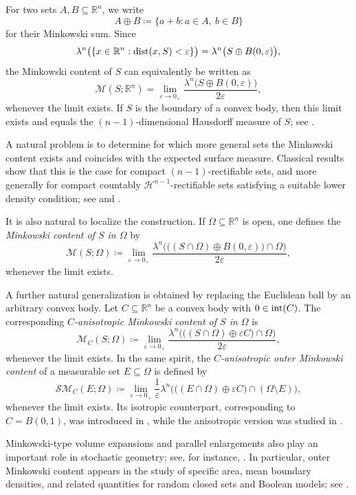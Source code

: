 \documentclass[pdflatex,sn-mathphys-num]{sn-jnl}
\theoremstyle{plain}
\theoremstyle{definition}
\DeclareMathOperator{\inter}{\textup{int}}
\DeclareMathOperator{\dist}{\textup{dist}}
\begin{document}
For two sets $A,B\subseteq\mathbb{R}^n$, we write
\[
A\oplus B \coloneq \{a+b : a\in A,\ b\in B\}
\]
for their Minkowski sum. Since
\[
\lambda^n\big(\{x\in\mathbb{R}^n:\dist(x,S)<\varepsilon\}\big)=\lambda^n\big(S\oplus B(0,\varepsilon)\big),
\]
the Minkowski content of $S$ can equivalently be written as
\[
\mathcal{M}(S; \mathbb{R}^n)
=
\lim_{\varepsilon\to0_+}
\frac{\lambda^n\big(S\oplus B(0,\varepsilon)\big)}{2\varepsilon},
\]
whenever the limit exists. If $S$ is the boundary of a convex body, then this limit exists and equals the $(n-1)$-dimensional Hausdorff measure of $S$; see \cite[Chapter 5]{rolf}.

A natural problem is to determine for which more general sets the Minkowski content exists and coincides with the expected surface measure. Classical results show that this is the case for compact $(n-1)$-rectifiable sets, and more generally for compact countably $\mathcal{H}^{n-1}$-rectifiable sets satisfying a suitable lower density condition; see \cite[p.~275]{federer} and \cite[Theorem 2.104]{ambrosio}.

It is also natural to localize the construction. If $\Omega\subseteq\mathbb{R}^n$ is open, one defines the \emph{Minkowski content of $S$ in $\Omega$} by
\begin{equation}\label{kek}
\mathcal{M}(S;\Omega)\coloneq
\lim_{\varepsilon\to0_+}
\frac{\lambda^n\Big(\big((S\cap\Omega)\oplus B(0,\varepsilon)\big)\cap\Omega\Big)}{2\varepsilon},
\end{equation}
whenever the limit exists.

A further natural generalization is obtained by replacing the Euclidean ball by an arbitrary convex body. Let $C\subseteq\mathbb{R}^n$ be a convex body with $0\in\inter(C)$. The corresponding \emph{$C$-anisotropic Minkowski content of $S$ in $\Omega$} is
\[
\mathcal{M}_C(S;\Omega)\coloneq
\lim_{\varepsilon\to0_+}
\frac{\lambda^n\Big(\big((S\cap\Omega)\oplus \varepsilon C\big)\cap\Omega\Big)}{2\varepsilon},
\]
whenever the limit exists. In the same spirit, the \emph{$C$-anisotropic outer Minkowski content} of a measurable set $E\subseteq\Omega$ is defined by
\[
\mathcal{SM}_C(E;\Omega)\coloneq
\lim_{\varepsilon\to0_+}
\frac{1}{\varepsilon}
\lambda^n\Big(\big((E\cap\Omega)\oplus\varepsilon C\big)\cap(\Omega\setminus E)\Big),
\]
whenever the limit exists. Its isotropic counterpart, corresponding to $C=B(0,1)$, was introduced in \cite{Villa4}, while the anisotropic version was studied in \cite{chambolle, Villa2}. 

Minkowski-type volume expansions and parallel enlargements also play an important role in stochastic geometry; see, for instance, \cite{KR06, HL00}. In particular, outer Minkowski content appears in the study of specific area, mean boundary densities, and related quantities for random closed sets and Boolean models; see \cite{Villa4, VillaMean, VillaSpecific}.
\end{document}
